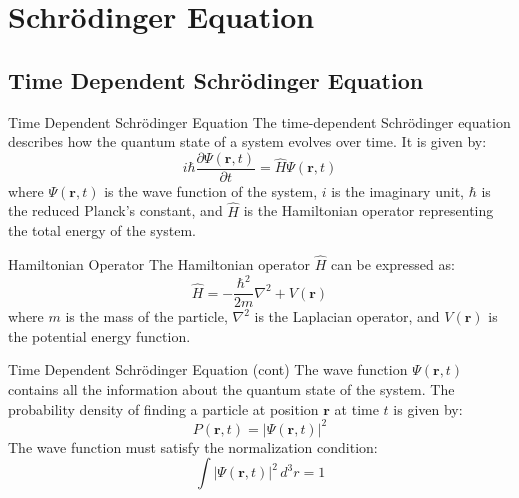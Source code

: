 \section{Schrödinger Equation}

\subsection{Time Dependent Schrödinger Equation}

\begin{frame}{Time Dependent Schrödinger Equation}
	The time-dependent Schrödinger equation describes how the quantum state of a system evolves over time. It is given by:
	\begin{equation*}
		i\hbar \frac{\partial \Psi(\mathbf{r}, t)}{\partial t} = \hat{H} \Psi(\mathbf{r}, t)
	\end{equation*}
	where $\Psi(\mathbf{r}, t)$ is the wave function of the system, $i$ is the imaginary unit, $\hbar$ is the reduced Planck's constant, and $\hat{H}$ is the Hamiltonian operator representing the total energy of the system.
	\begin{block}{Hamiltonian Operator}
		The Hamiltonian operator $\hat{H}$ can be expressed as:
		\begin{equation*}
			\hat{H} = -\frac{\hbar^2}{2m} \nabla^2 + V(\mathbf{r})
		\end{equation*}
		where $m$ is the mass of the particle, $\nabla^2$ is the Laplacian operator, and $V(\mathbf{r})$ is the potential energy function.
	\end{block}
\end{frame}


\begin{frame}{Time Dependent Schrödinger Equation (cont)}
	The wave function $\Psi(\mathbf{r}, t)$ contains all the information about the quantum state of the system. The probability density of finding a particle at position $\mathbf{r}$ at time $t$ is given by:
	\begin{equation*}
		P(\mathbf{r}, t) = |\Psi(\mathbf{r}, t)|^2
	\end{equation*}
	The wave function must satisfy the normalization condition:
	\begin{equation*}
		\int |\Psi(\mathbf{r}, t)|^2 \, d^3r = 1
	\end{equation*}
\end{frame}


